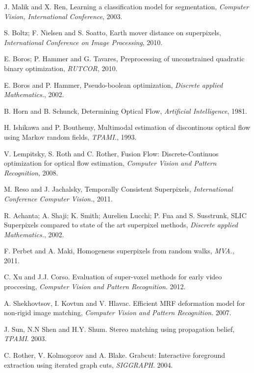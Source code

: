 \begin{thebibliography}{99}

J. Malik and X. Ren, Learning a classification model for segmentation, {\it Computer Vision, International Conference}, 2003.

S. Boltz; F. Nielsen and S. Soatto, Earth mover distance on superpixels, {\it International Conference on Image Processing}, 2010.

E. Boros; P. Hammer and G. Tavares, Preprocessing of unconstrained quadratic binary optimization, {\it RUTCOR}, 2010.

E. Boros and P. Hammer, Pseudo-boolean optimization, {\it Discrete applied Mathematics.}, 2002.

B. Horn and B. Schunck, Determining Optical Flow, {\it Artificial Intelligence}, 1981.

H. Ishikawa and P. Bouthemy, Multimodal estimation of discontinous optical flow using Markov random fields, {\it TPAMI.}, 1993.

V. Lempitsky, S. Roth and C. Rother, Fusion Flow: Discrete-Continuos optimization for optical flow estimation, {\it Computer Vision and Pattern Recognition}, 2008.

M. Reso and J. Jachalsky, Temporally Consistent Superpixels, {\it International Conference Computer Vision.}, 2011.

R. Achanta; A. Shaji; K. Smith; Aurelien Lucchi; P. Fua and S. Susstrunk, SLIC Superpixels compared to state of the art superpixel methods, {\it Discrete applied Mathematics.}, 2002.

F. Perbet and A. Maki, Homogeneus superpixels from random walks, {\it MVA.}, 2011.

C. Xu and J.J. Corso. Evaluation of super-voxel methods for early video proccesing, {\it Computer Vision and Pattern Recognition}. 2012.

A. Shekhovtsov, I. Kovtun and V. Hlavac. Efficient MRF deformation model for non-rigid image matching, {\it Computer Vision and Pattern Recognition}. 2007.

J. Sun, N.N Shen and H.Y. Shum. Stereo matching using propagation belief, {\it TPAMI}. 2003.

C. Rother, V. Kolmogorov and A. Blake. Grabcut: Interactive foreground extraction using iterated graph cuts, {\it SIGGRAPH}. 2004.


\end{thebibliography}
